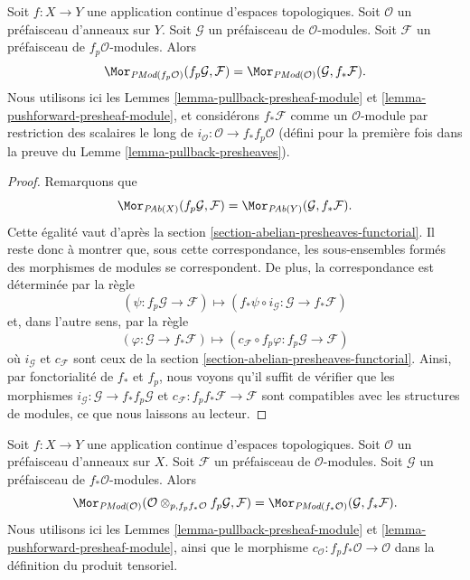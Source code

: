 \begin{lemma}
\label{lemma-adjoint-push-pull-presheaves-modules}
Soit $f : X \to Y$ une application continue d'espaces topologiques.
Soit $\mathcal{O}$ un préfaisceau d'anneaux sur $Y$.
Soit $\mathcal{G}$ un préfaisceau de $\mathcal{O}$-modules.
Soit $\mathcal{F}$ un préfaisceau de $f_p\mathcal{O}$-modules.
Alors
$$
\Mor_{\textit{PMod}(f_p\mathcal{O})}(f_p\mathcal{G}, \mathcal{F})
=
\Mor_{\textit{PMod}(\mathcal{O})}(\mathcal{G}, f_*\mathcal{F}).
$$
Nous utilisons ici
les Lemmes \ref{lemma-pullback-presheaf-module}
et \ref{lemma-pushforward-presheaf-module}, et considérons
$f_*\mathcal{F}$ comme un $\mathcal{O}$-module par restriction des scalaires le long de
$i_\mathcal{O} : \mathcal{O} \to f_*f_p\mathcal{O}$
(défini pour la première fois dans la preuve du Lemme \ref{lemma-pullback-presheaves}).
\end{lemma}

\begin{proof}
Remarquons que
$$
\Mor_{\textit{PAb}(X)}(f_p\mathcal{G}, \mathcal{F})
=
\Mor_{\textit{PAb}(Y)}(\mathcal{G}, f_*\mathcal{F}).
$$
Cette égalité vaut d'après la section \ref{section-abelian-presheaves-functorial}.
Il reste donc à montrer que, sous cette correspondance, les
sous-ensembles formés des morphismes de modules se correspondent. De plus, la correspondance
est déterminée par la règle
$$
(\psi : f_p\mathcal{G} \to \mathcal{F})
\longmapsto
(f_*\psi \circ i_\mathcal{G} :
\mathcal{G} \to f_* \mathcal{F})
$$
et, dans l'autre sens, par la règle
$$
(\varphi : \mathcal{G} \to f_* \mathcal{F})
\longmapsto
(c_\mathcal{F} \circ f_p\varphi : f_p\mathcal{G} \to \mathcal{F})
$$
où $i_\mathcal{G}$ et $c_\mathcal{F}$ sont ceux de la
section \ref{section-abelian-presheaves-functorial}.
Ainsi, par fonctorialité de $f_*$ et $f_p$, nous voyons
qu'il suffit de vérifier que les morphismes
$i_\mathcal{G} : \mathcal{G} \to f_* f_p \mathcal{G}$ et
$c_\mathcal{F} : f_p f_* \mathcal{F} \to \mathcal{F}$
sont compatibles avec les structures de modules, ce que nous laissons au lecteur.
\end{proof}

\begin{lemma}
\label{lemma-adjoint-pull-push-presheaves-modules}
Soit $f : X \to Y$ une application continue d'espaces topologiques.
Soit $\mathcal{O}$ un préfaisceau d'anneaux sur $X$.
Soit $\mathcal{F}$ un préfaisceau de $\mathcal{O}$-modules.
Soit $\mathcal{G}$ un préfaisceau de $f_*\mathcal{O}$-modules.
Alors
$$
\Mor_{\textit{PMod}(\mathcal{O})}(
\mathcal{O} \otimes_{p, f_pf_*\mathcal{O}} f_p\mathcal{G}, \mathcal{F})
=
\Mor_{\textit{PMod}(f_*\mathcal{O})}(\mathcal{G}, f_*\mathcal{F}).
$$
Nous utilisons ici
les Lemmes \ref{lemma-pullback-presheaf-module}
et \ref{lemma-pushforward-presheaf-module}, ainsi que
le morphisme $c_\mathcal{O} : f_pf_*\mathcal{O} \to \mathcal{O}$
dans la définition du produit tensoriel.
\end{lemma}

